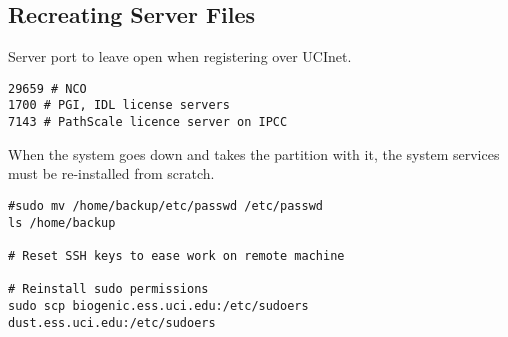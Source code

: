 \documentclass[12pt,twoside]{article}
\begin{document}
\subsection{Recreating Server Files}\label{sxn:srv}
Server port to leave open when registering over UCInet.
\begin{verbatim}
29659 # NCO
1700 # PGI, IDL license servers
7143 # PathScale licence server on IPCC
\end{verbatim}
When the system goes down and takes the  partition with
it, the system services must be re-installed from scratch.
\begin{verbatim}
#sudo mv /home/backup/etc/passwd /etc/passwd
ls /home/backup

# Reset SSH keys to ease work on remote machine 

# Reinstall sudo permissions
sudo scp biogenic.ess.uci.edu:/etc/sudoers dust.ess.uci.edu:/etc/sudoers


\end{verbatim}
\end{document}
